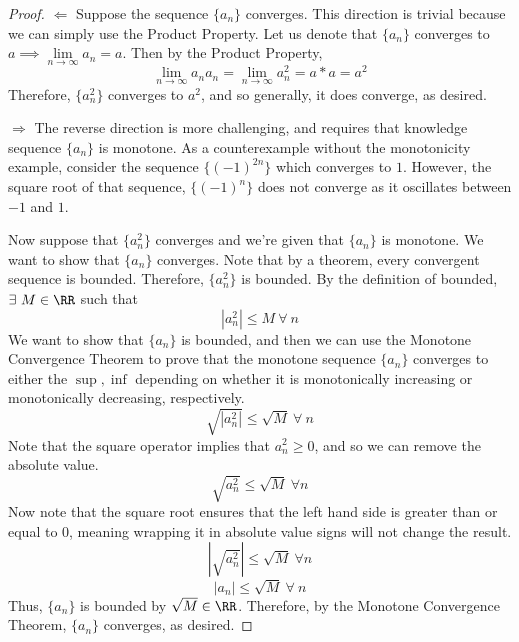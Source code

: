 \documentclass[12pt]{scrartcl}
\begin{document}
\begin{proof}

\hfill

$\Longleftarrow$ Suppose the sequence $\{a_n\}$ converges. This direction is trivial because we can simply use the
Product Property. Let us denote that $\{a_n\}$ converges to $a \implies \underset{n\to\infty}{\lim}a_n = a$. 
Then by the Product Property, 
\[\lim_{n\to\infty} a_n a_n = \lim_{n\to\infty}a_n^2 = a * a = a^2 \] 
Therefore, $\{a_n^2\}$ converges to $a^2$, and so generally, it does converge, as desired.

\hfill

$\Longrightarrow$ The reverse direction is more challenging, and requires that knowledge sequence 
$\{a_n\}$ is monotone. As a counterexample without the monotonicity example, consider the sequence $\{(-1)^{2n}\}$ which converges to $1$. However, the 
square root of that sequence, $\{(-1)^n\}$ does not converge as it oscillates between $-1$ and $1$. 

\hfill

Now suppose that $\{a_n^2\}$ converges and we're given that $\{a_n\}$ is monotone.
We want to show that $\{a_n\}$ converges. Note that by a theorem, every convergent sequence 
is bounded. Therefore, $\{a_n^2\}$ is bounded. By the definition of bounded, $\exists \ M \in \RR$ 
such that 
\[|a_n^2| \leq M \ \forall \ n\]
We want to show that $\{a_n\}$ is bounded, and then we can use the Monotone Convergence Theorem to prove that the monotone sequence 
$\{a_n\}$ converges to either the $\sup, \inf$ depending on whether it is monotonically increasing
or monotonically decreasing, respectively. 
\[\sqrt{|a_n^2|} \leq \sqrt{M} \ \forall \ n\]
Note that the square operator implies that $a_n^2 \geq 0$, and so we can remove the absolute value. 
\[\sqrt{a_n^2} \leq \sqrt{M} \ \forall n\]
Now note that the square root ensures that the left hand side is greater than or equal to $0$, meaning wrapping it 
in absolute value signs will not change the result. 
\[|\sqrt{a_n^2}| \leq \sqrt{M} \ \forall n\]
\[|a_n| \leq \sqrt{M} \ \forall \ n\]
Thus, $\{a_n\}$ is bounded by $\sqrt{M} \in \RR$. Therefore, by the Monotone Convergence Theorem, 
$\{a_n\}$ converges, as desired. 
  
\end{proof}
\end{document}
